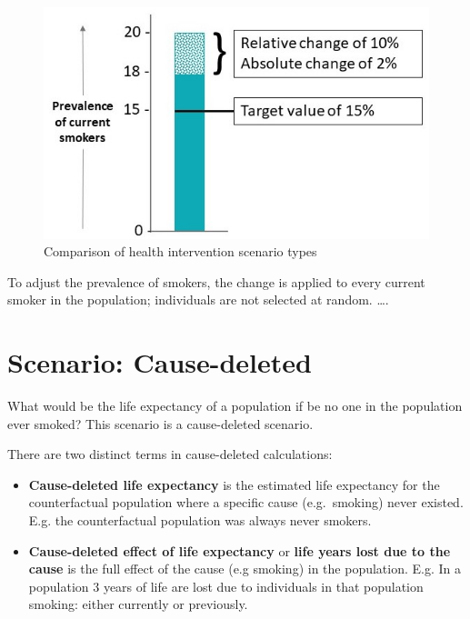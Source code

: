 \documentclass[]{book}
\begin{document}
\begin{figure}

{\centering \includegraphics{Scenario-Abs, Rel, Target cropped} 

}

\caption{Comparison of health intervention scenario types}\label{fig:unnamed-chunk-10}
\end{figure}

To adjust the prevalence of smokers, the change is applied to every
current smoker in the population; individuals are not selected at
random. \ldots{}.

\section{Scenario: Cause-deleted}\label{scenario-cause-deleted}

What would be the life expectancy of a population if be no one in the
population ever smoked? This scenario is a cause-deleted scenario.

There are two distinct terms in cause-deleted calculations:

\begin{itemize}
\item
  \textbf{Cause-deleted life expectancy} is the estimated life
  expectancy for the counterfactual population where a specific cause
  (e.g.~smoking) never existed. E.g. the counterfactual population was
  always never smokers.
\item
  \textbf{Cause-deleted effect of life expectancy} or \textbf{life years
  lost due to the cause} is the full effect of the cause (e.g smoking)
  in the population. E.g. In a population 3 years of life are lost due
  to individuals in that population smoking: either currently or
  previously.
\end{itemize}
\end{document}
